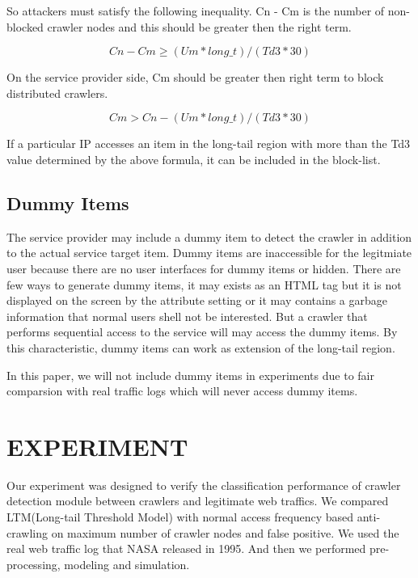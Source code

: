 \documentclass[sigconf,anonymous=true]{acmart}
\begin{document}
So attackers must satisfy the following inequality. Cn - Cm is the number of non-blocked crawler nodes and this should be greater then the right term.

  \begin{displaymath}
Cn - Cm \geq (Um * long\_t) / (Td3 * 30)
  \end{displaymath}

On the service provider side, Cm should be greater then right term to block distributed crawlers.

  \begin{displaymath}
Cm > Cn - (Um * long\_t) / (Td3 * 30)
  \end{displaymath}

If a particular IP accesses an item in the long-tail region with more than the Td3 value determined by the above formula, it can be included in the block-list.


\subsection{Dummy Items}
The service provider may include a dummy item to detect the crawler in addition to the actual service target item. Dummy items are inaccessible for the legitmiate user because there are no user interfaces for dummy items or hidden. There are few ways to generate dummy items, it may exists as an HTML tag but it is not displayed on the screen by the attribute setting or it may contains a garbage information that normal users shell not be interested. But a crawler that performs sequential access to the service will may access the dummy items. By this characteristic, dummy items can work as extension of the long-tail region.

In this paper, we will not include dummy items in experiments due to fair comparsion with real traffic logs which will never access dummy items.



%
%
\section{EXPERIMENT}
Our experiment was designed to verify the classification performance of crawler detection module between crawlers and legitimate  web traffics. We compared LTM(Long-tail Threshold Model) with normal access frequency based anti-crawling on maximum number of crawler nodes and false positive.
We used the real web traffic log that NASA released in 1995. And then we performed pre-processing, modeling and simulation.
\end{document}
